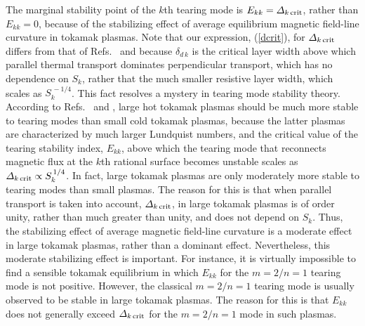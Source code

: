 \documentclass[12pt,prb,aps]{revtex4-1}
\begin{document}
The marginal stability point of the $k$th tearing mode is $E_{kk}=  {\mit\Delta}_{k\,{\rm crit}}$, rather than $E_{kk}=0$,\cite{fkr,ara} because of the
stabilizing effect of average equilibrium magnetic field-line curvature in tokamak plasmas.\cite{ggj,ggj1} Note that our expression, (\ref{dcrit}),  for
${\mit\Delta}_{k\,{\rm crit}}$ differs from that of Refs.~ and  because  $\delta_{d\,k}$ is the critical layer width above which
parallel thermal transport dominates perpendicular transport, which has no dependence on $S_k$, rather that the much smaller resistive
layer width, which scales as $S_k^{\,-1/4}$.\cite{lut,con1} This fact resolves a mystery in tearing mode stability theory. According to Refs.~ and ,
large hot tokamak plasmas should be much more stable to tearing modes than small cold tokamak plasmas, because the latter plasmas are characterized by much
larger Lundquist numbers, and the critical value of the tearing stability index, $E_{kk}$,  above which the tearing mode that reconnects
magnetic flux at the $k$th rational surface becomes unstable scales as ${\mit\Delta}_{k\,{\rm crit}}\propto S_k^{\,1/4}$. In fact, large  tokamak plasmas are only moderately more
stable to tearing modes than small  plasmas. The reason for this is that when parallel transport is taken into account, ${\mit\Delta}_{k\,{\rm crit}}$, in large tokamak
plasmas is of order unity, rather than much greater than unity, and does not depend on $S_k$. Thus, the stabilizing effect of average magnetic field-line curvature is a moderate effect in
large tokamak plasmas, rather than a dominant effect. Nevertheless, this moderate stabilizing effect is important. For instance, it is virtually impossible to find a
sensible tokamak equilibrium in which $E_{kk}$ for the $m=2/n=1$ tearing mode is not positive. However,  the classical $m=2/n=1$ tearing mode is usually observed to
be stable in large tokamak plasmas. The reason for this is that $E_{kk}$ does not generally exceed ${\mit\Delta}_{k\,{\rm crit}}$ for the $m=2/n=1$  mode in such  plasmas. 
\end{document}
